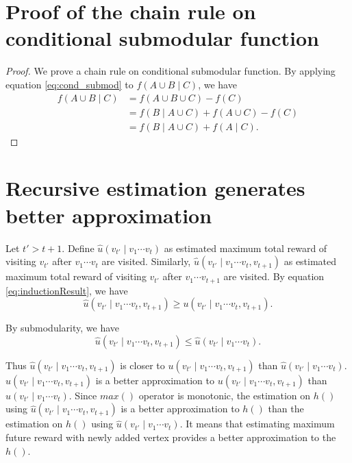 \documentclass[12pt]{article}
\begin{document}
\section{Proof of the chain rule on conditional submodular function}
\label{app:cond_submod_chain_rule}
\begin{proof}

We prove a chain rule on conditional submodular function.
By applying equation \eqref{eq:cond_submod} to $ f( A \cup B \mid C ) $, we have
\begin{equation}
\label{eq:cond_submod_chain_rule}
\begin{aligned}
f( A \cup B \mid C ) & = f( A \cup B \cup C ) - f( C ) \\
& = f( B \mid A \cup C ) + f( A \cup C ) - f( C ) \\
& = f( B \mid A \cup C ) + f( A \mid C).
\end{aligned}
\end{equation} 

\end{proof}

\section{Recursive estimation generates better approximation}
\label{app:better_approximation}
Let $ t' > t + 1 $.
Define $ \hat{u}(v_{t'} \mid v_{1} \cdots v_{t}) $ as estimated maximum total reward of visiting $ v_{t'} $ after $ v_{1} \cdots v_{t} $ are visited.
Similarly, $ \hat{u}(v_{t'} \mid v_{1} \cdots v_{t}, v_{t+1}) $ as estimated maximum total reward of visiting $ v_{t'} $ after $ v_{1} \cdots v_{t+1} $ are visited.
By equation \eqref{eq:inductionResult}, we have 
\begin{equation}
\hat{u}(v_{t'} \mid v_{1} \cdots v_{t}, v_{t+1}) \geq u(v_{t'} \mid v_{1} \cdots v_{t}, v_{t+1}).
\end{equation}

By submodularity, we have
\begin{equation}
\hat{u}(v_{t'} \mid v_{1} \cdots v_{t}, v_{t+1}) \leq \hat{u}(v_{t'} \mid v_{1} \cdots v_{t}).
\end{equation}

Thus $ \hat{u}(v_{t'} \mid v_{1} \cdots v_{t}, v_{t+1}) $ is closer to $ u(v_{t'} \mid v_{1} \cdots v_{t}, v_{t+1}) $ than $ \hat{u}(v_{t'} \mid v_{1} \cdots v_{t}) $.
$ \hat{u}(v_{t'} \mid v_{1} \cdots v_{t}, v_{t+1}) $ is a better approximation to $ u(v_{t'} \mid v_{1} \cdots v_{t}, v_{t+1}) $ than $ \hat{u}(v_{t'} \mid v_{1} \cdots v_{t}) $.
Since $ max() $ operator is monotonic, the estimation on $ h() $ using $ \hat{u}(v_{t'} \mid v_{1} \cdots v_{t}, v_{t+1}) $  is a better approximation to $ h() $ than the estimation on $ h() $ using $ \hat{u}(v_{t'} \mid v_{1} \cdots v_{t}) $.
It means that estimating maximum future reward with newly added vertex provides a better approximation to the $ h() $.
\end{document}
